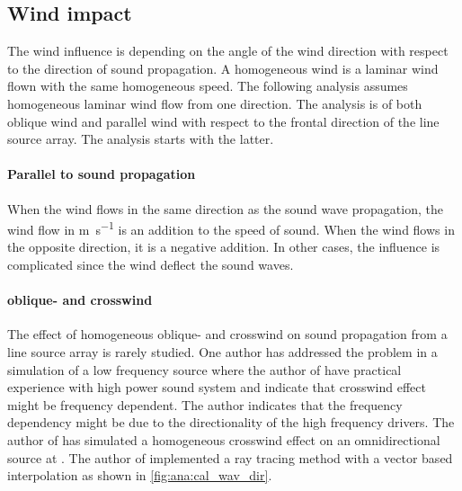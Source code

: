 \subsection{Wind impact}
The wind influence is depending on the angle of the wind direction with respect to the direction of sound propagation. A homogeneous wind is a laminar wind flown with the same homogeneous speed. The following analysis assumes homogeneous laminar wind flow from one direction. The analysis is of both oblique wind and parallel wind with respect to the frontal direction of the line source array. The analysis starts with the latter. 

\paragraph{Parallel to sound propagation} When the wind flows in the same direction as the sound wave propagation, the wind flow in \si{\meter\per\second} is an addition to the speed of sound. When the wind flows in the opposite direction, it is a negative addition.  In other cases, the influence is complicated since the wind deflect the sound waves.


\paragraph{oblique- and crosswind} The effect of homogeneous oblique- and crosswind on sound propagation from a line source array is rarely studied. One author has addressed the problem in a simulation of a low frequency source \citep{crosswind_simulation} where the author of  \citep{BALLOU2008xi} have practical experience with high power sound system and indicate that crosswind effect might be frequency dependent.   The author indicates that the frequency dependency might be due to the directionality of the high frequency drivers. The author of \citep{crosswind_simulation} has simulated a homogeneous crosswind effect on an omnidirectional source at . The author of \citep{ray_tracing} implemented a ray tracing method with a vector based interpolation as shown in \autoref{fig:ana:cal_wav_dir}.



\startexplain
{}
\stopexplain

